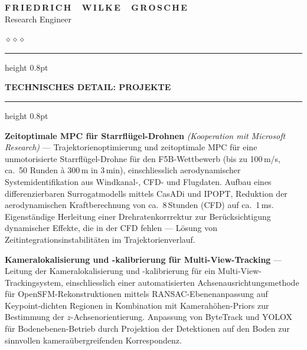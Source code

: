 \documentclass[a4paper,10pt]{article}
\newlength{\mainwidth}
\newlength{\mainpadding}
\newcommand{\mainsection}[1]{%
  \vspace{14pt}%
  {\color{ruleColor}\hrule height 0.8pt}%
  \vspace{6pt}%
  {\color{mainHeading}\bfseries\large\MakeUppercase{#1}}%
  \vspace{4pt}%
  {\color{ruleColor}\hrule height 0.8pt}%
  \vspace{8pt}\par%
}
\newcommand{\divider}{%
  \begin{center}%
    \vspace{2pt}%
    {\color{mainLight}\small$\diamond$\hspace{6pt}$\diamond$\hspace{6pt}$\diamond$}%
    \vspace{2pt}%
  \end{center}%
}
\begin{document}
%
\begin{minipage}[t][\textheight]{\mainwidth}
  \hspace{\mainpadding}%
  \begin{minipage}[t]{\dimexpr\mainwidth-2\mainpadding\relax}
    \vspace{0.7cm}

    \begin{center}
      {\color{mainHeading}\fontsize{28}{32}\selectfont\bfseries
       F\,R\,I\,E\,D\,R\,I\,C\,H~~\,W\,I\,L\,K\,E~~\,G\,R\,O\,S\,C\,H\,E}\\[6pt]
      {\color{mainLight}\normalsize Research Engineer}
    \end{center}
    \divider

    \mainsection{Technisches Detail: Projekte}

    {\color{mainText}\small
      \textbf{Zeitoptimale MPC f\"ur Starrfl\"ugel-Drohnen}
      \textit{(Kooperation mit Microsoft Research)} ---
      Trajektorienoptimierung und zeitoptimale MPC f\"ur eine unmotorisierte
      Starrfl\"ugel-Drohne f\"ur den F5B-Wettbewerb (bis zu 100\,m/s, ca.\ 50 Runden
      \`a 300\,m in 3\,min), einschliesslich aerodynamischer Systemidentifikation aus
      Windkanal-, CFD- und Flugdaten. Aufbau eines differenzierbaren Surrogatmodells
      mittels CasADi und IPOPT, Reduktion der aerodynamischen Kraftberechnung von
      ca.\ 8\,Stunden (CFD) auf ca.\ 1\,ms. Eigenst\"andige Herleitung einer
      Drehratenkorrrektur zur Ber\"ucksichtigung dynamischer Effekte, die in der CFD
      fehlen --- L\"osung von Zeitintegrationsinstabilit\"aten im Trajektorienverlauf.
    }
    \vspace{8pt}

    {\color{mainText}\small
      \textbf{Kameralokalisierung und -kalibrierung f\"ur Multi-View-Tracking} ---
      Leitung der Kameralokalisierung und -kalibrierung f\"ur ein Multi-View-Trackingsystem,
      einschliesslich einer automatisierten Achsenausrichtungsmethode f\"ur
      OpenSFM-Rekonstruktionen mittels RANSAC-Ebenenanpassung auf Keypoint-dichten
      Regionen in Kombination mit Kamerah\"ohen-Priors zur Bestimmung der $z$-Achsenorientierung.
      Anpassung von ByteTrack und YOLOX f\"ur Bodenebenen-Betrieb durch Projektion der
      Detektionen auf den Boden zur sinnvollen kamera\"ubergreifenden Korrespondenz.
    }
    \vspace{8pt}


\end{minipage}
\end{minipage}
\end{document}
